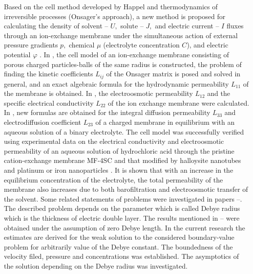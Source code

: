 \documentclass[12pt]{llncs}
\begin{document}
Based on the cell method developed by Happel and thermodynamics of irreversible processes (Onsager’s approach), a new method is proposed for calculating the density of solvent – $U,$ solute – $J,$ and electric current – $I$ fluxes through an ion-exchange membrane under the simultaneous action of external pressure gradients $p,$ chemical $\mu$ (electrolyte concentration $C$), and electric potential $\varphi$ \cite{Fil1}. In \cite{Fil1}, the cell model of an ion-exchange membrane consisting of porous charged particles-balls of the same radius is constructed, the problem of finding the kinetic coefficients $L_{ij}$ of the Onsager matrix is posed and solved in general, and an exact algebraic formula for the hydrodynamic permeability $L_{11}$ of the membrane is obtained. In \cite{Fil2}, the electroosmotic permeability $L_{12}$ and the specific electrical conductivity $L_{22}$ of the ion exchange membrane were calculated. In \cite{Fil3}, new formulas are obtained for the integral diffusion permeability $L_{33}$ and electrodiffusion coefficient $L_{23}$ of a charged membrane in equilibrium with an aqueous solution of a binary electrolyte. The cell model was successfully verified using experimental data on the electrical conductivity and electroosmotic permeability of an aqueous solution of hydrochloric acid through the pristine cation-exchange membrane MF-4SC and that modified by halloysite nanotubes and platinum or iron nanoparticles \cite{Fil4}. It is shown that with an increase in the equilibrium concentration of the electrolyte, the total permeability of the membrane also increases due to both barofiltration and electroosmotic transfer of the solvent. Some related statements of problems were investigated in papers \cite{rel2}--\cite{rel3}. The described problem depends on the parameter which is called Debye radius which is the thickness of electric double layer. The results mentioned in \cite{Fil1}--\cite{Fil4} were obtained under the assumption of zero Debye length. In the current research the estimates are derived for the weak solution to the considered boundary-value problem for arbitrarily value of the Debye constant. The boundedness of the velocity filed, pressure and concentrations was established.  The asymptotics of the solution depending on the Debye radius was investigated.
\vspace{2cm}
\end{document}

